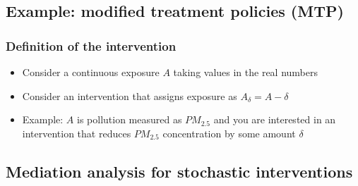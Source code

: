 \documentclass[
  12pt,
]{book}
\providecommand{\tightlist}{%
  \setlength{\itemsep}{0pt}\setlength{\parskip}{0pt}}
\theoremstyle{definition}
\theoremstyle{definition}
\theoremstyle{definition}
\newcommand{\1}{\mathbbm{1}}
\begin{document}
\hypertarget{example-modified-treatment-policies-mtp-diaz2020causal}{%
\subsection*{\texorpdfstring{Example: modified treatment policies (MTP) \citep{diaz2020causal}}{Example: modified treatment policies (MTP) {[}@diaz2020causal{]}}}\label{example-modified-treatment-policies-mtp-diaz2020causal}}


\hypertarget{definition-of-the-intervention-1}{%
\subsubsection*{Definition of the intervention}\label{definition-of-the-intervention-1}}


\begin{itemize}
\tightlist
\item
  Consider a continuous exposure \(A\) taking values in the real numbers
\item
  Consider an intervention that assigns exposure as \(A_\delta = A - \delta\)
\item
  Example: \(A\) is pollution measured as \(PM_{2.5}\) and you are interested in an
  intervention that reduces \(PM_{2.5}\) concentration by some amount \(\delta\)
\end{itemize}

\hypertarget{mediation-analysis-for-stochastic-interventions}{%
\subsection{Mediation analysis for stochastic interventions}\label{mediation-analysis-for-stochastic-interventions}}
\end{document}
